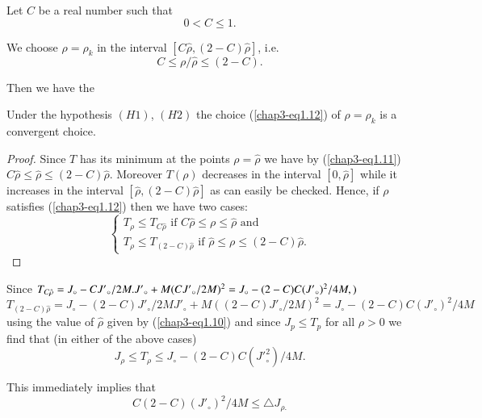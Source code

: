 Let $C$ be a real number such that
\begin{equation*}
0 < C \leq 1.\tag{1.11}\label{chap3-eq1.11}
\end{equation*}

We choose $\rho = \rho_{k}$ in the interval $[C\hat{\rho}, (2-C)\hat{\rho}]$, i.e. 
\begin{equation*}
C \leq \rho / \hat{\rho} \leq (2-C).\tag{1.12}\label{chap3-eq1.12}
\end{equation*}

Then we have the
\begin{proposition}\label{chap3-prop1.4}
Under the hypothesis $(H1)$, $(H2)$ the choice (\ref{chap3-eq1.12}) of $\rho = \rho_{k}$ is a convergent choice.
\end{proposition}

\begin{proof}
Since $T$ has its minimum at the points $\rho = \hat{\rho}$ we have by (\ref{chap3-eq1.11}) $C\hat{\rho} \leq \hat{\rho} \leq (2-C) \hat{\rho}$. Moreover $T(\rho)$ decreases in the interval $[0,\hat{\rho}]$ while it increases in the interval $[\hat{\rho}, (2-C)\hat{\rho}]$ as can easily be checked. Hence, if $\rho$ satisfies (\ref{chap3-eq1.12}) then we have two cases:
\begin{equation*}
\begin{cases}
T_{\rho} \leq T_{C\hat{\rho}} \text{ if } C\hat{\rho} \leq \rho \leq \hat{\rho} \text{ and }\\
T_{\rho} \leq T_{(2-C)\hat{\rho}} \text{ if } \hat{\rho} \leq \rho \leq (2-C)\hat{\rho}.
\end{cases}
\end{equation*}
\end{proof}

Since $T_{C\hat{\rho}} = J_{\circ} - C{J'}_{\circ} / 2M. {J'}_{\circ}
+ M(C {J'}_{\circ}/ 2M)^{2} = J_{\circ}
-(2-C)\break C({J'}_{\circ})^{2}/4M,)$ 
{\fontsize{10}{12}\selectfont
$$
T_{(2-C)\hat{\rho}} = J_{\circ}-(2-C) {J'}_{\circ}/2M {J'}_{\circ} +
M((2-C){J'}_{\circ} / 2M)^{2} = J_{\circ}-(2-C)C({J'}_{\circ})^{2}/4M 
$$}
using the value of $\hat{\rho}$ given by (\ref{chap3-eq1.10}) and since $J_p \leq T_p$ for all $\rho > 0$ we find that (in either of the above cases)
$$
J_{\rho} \leq T_{\rho} \leq J_{\circ} - (2-C)C({J'}_{\circ}^{2})/4M.
$$

This immediately implies that
\begin{equation*}
C(2-C)({J'}_{\circ})^{2} / 4M \leq \triangle J_{\rho.}\tag{1.13}\label{chap3-eq1.13}
\end{equation*}

